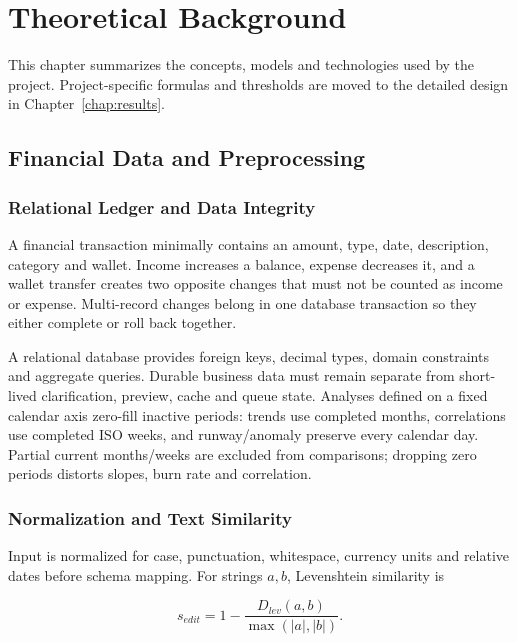 \chapter{Theoretical Background}
\label{chap:theory}

This chapter summarizes the concepts, models and technologies used by the project. Project-specific formulas and thresholds are moved to the detailed design in Chapter~\ref{chap:results}.

\section{Financial Data and Preprocessing}
\label{sec:fin-data}

\subsection{Relational Ledger and Data Integrity}

A financial transaction minimally contains an amount, type, date, description, category and wallet. Income increases a balance, expense decreases it, and a wallet transfer creates two opposite changes that must not be counted as income or expense. Multi-record changes belong in one database transaction so they either complete or roll back together.

A relational database provides foreign keys, decimal types, domain constraints and aggregate queries. Durable business data must remain separate from short-lived clarification, preview, cache and queue state. Analyses defined on a fixed calendar axis zero-fill inactive periods: trends use completed months, correlations use completed ISO weeks, and runway/anomaly preserve every calendar day. Partial current months/weeks are excluded from comparisons; dropping zero periods distorts slopes, burn rate and correlation.

\subsection{Normalization and Text Similarity}
\label{subsec:text-similarity}

Input is normalized for case, punctuation, whitespace, currency units and relative dates before schema mapping. For strings $a,b$, Levenshtein similarity \cite{levenshtein1966} is

\begin{equation}
  s_{edit}=1-\frac{D_{lev}(a,b)}{\max(|a|,|b|)}.
\end{equation}

